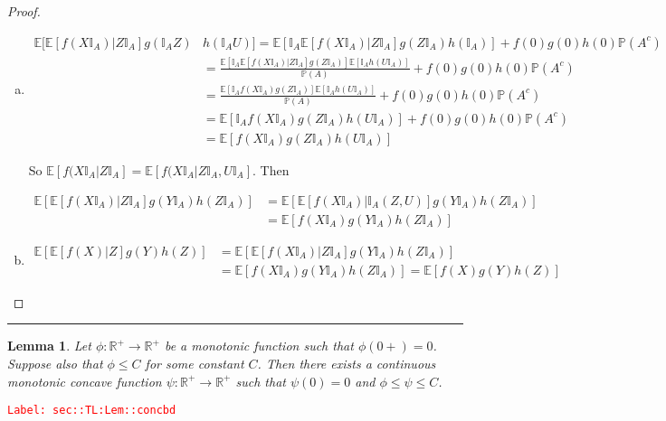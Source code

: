 \documentclass[12pt]{article}
\newcommand{\mb}{\mathbb}
\newcommand{\ra}{\rightarrow}
\newcommand{\tr}{\textcolor{red}}
\newcommand{\labe}[1]{\tr{\texttt{Label: #1}}}
\newcommand{\lin}{\rule{\linewidth}{0.4 pt}}
\newcommand{\pr}{\mb{P}}							%
\newcommand{\ex}[1]{\mb{E}\left[#1\right]}			%
\newtheorem{lem}[thms]{Lemma}
\begin{document}
\begin{proof}
\begin{enumerate}[(a)]
By linearity, this also holds for all bounded and measurable \(f,g\) and \(h\) with no restrictions on \(f(0),g(0),h(0)\), so the proof is complete.

\item 

\begin{align*}
\mb{E}\bigg[\ex{f(X\mb{I}_A)| Z\mb{I}_A}g(\mb{I}_AZ)&h(\mb{I}_AU)\bigg] = \ex{\mb{I}_A\ex{f(X\mb{I}_A)|Z\mb{I}_A}g(Z\mb{I}_A)h(\mb{I}_A)} + f(0)g(0)h(0)\pr(A^c)\\
&=\frac{\ex{\mb{I}_A\ex{f(X\mb{I}_A)|Z\mb{I}_A}g(Z\mb{I}_A)}\ex{\mb{I}_Ah(U\mb{I}_A)}}{\pr(A)} + f(0)g(0)h(0)\pr(A^c)\\
&=\frac{\ex{\mb{I}_Af(X\mb{I}_A)g(Z\mb{I}_A)}\ex{\mb{I}_Ah(U\mb{I}_A)}}{\pr(A)} + f(0)g(0)h(0)\pr(A^c)\\
&=\ex{\mb{I}_Af(X\mb{I}_A)g(Z\mb{I}_A)h(U\mb{I}_A)} + f(0)g(0)h(0)\pr(A^c)\\
&= \ex{f(X\mb{I}_A)g(Z\mb{I}_A)h(U\mb{I}_A)}
\end{align*}

So \(\ex{f(X\mb{I}_A|Z\mb{I}_A} = \ex{f(X\mb{I}_A|Z\mb{I}_A,U\mb{I}_A}\). Then 

\begin{align*}
\ex{\ex{f(X\mb{I}_A)|Z\mb{I}_A}g(Y\mb{I}_A)h(Z\mb{I}_A)} &= \ex{\ex{f(X\mb{I}_A)|\mb{I}_A(Z,U)}g(Y\mb{I}_A)h(Z\mb{I}_A)}\\
&=\ex{f(X\mb{I}_A)g(Y\mb{I}_A)h(Z\mb{I}_A)}
\end{align*}

\item 
\begin{align*}
\ex{\ex{f(X)|Z}g(Y)h(Z)} &= \ex{\ex{f(X\mb{I}_A)|Z\mb{I}_A}g(Y\mb{I}_A)h(Z\mb{I}_A)}\\
&= \ex{f(X\mb{I}_A)g(Y\mb{I}_A)h(Z\mb{I}_A)} = \ex{f(X)g(Y)h(Z)}
\end{align*}
\end{enumerate}
\end{proof}

\lin

\begin{lem}
Let \(\phi: \mb{R}^+ \ra \mb{R}^+\) be a monotonic function such that \(\phi(0+) = 0\). Suppose also that \(\phi \leq C\) for some constant \(C\). Then there exists a continuous monotonic concave function \(\psi:\mb{R}^+\ra \mb{R}^+\) such that \(\psi(0) = 0\) and \(\phi \leq \psi\leq C\).
\label{sec::TL:Lem::concbd}
\end{lem}
\labe{sec::TL:Lem::concbd}
\end{document}
